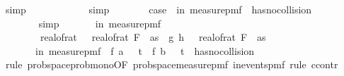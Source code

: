 \begin{isabellebody}
\ simp\isanewline
\ \ \ \ \isamarkupfalse%
\ \isamarkupfalse%
\ {\isachardoublequoteopen}{\isachardot}{\kern0pt}{\isachardot}{\kern0pt}{\isachardot}{\kern0pt}\ {\isacharequal}{\kern0pt}\ {}{\isacharslash}{\kern0pt}{}{\isachardoublequoteclose}\ \isamarkupfalse%
\ {\isacharparenleft}{\kern0pt}simp{\isacharparenright}{\kern0pt}\isanewline
\ \ \ \ \isamarkupfalse%
\ \isamarkupfalse%
\ case{\isacharunderscore}{\kern0pt}{}{\isacharcolon}{\kern0pt}\ {\isachardoublequoteopen}{\isasymP}{\isacharparenleft}{\kern0pt}{\isasymomega}\ in\ measure{\isacharunderscore}{\kern0pt}pmf\ {\isasymOmega}\ {\isasymnot}has{\isacharunderscore}{\kern0pt}no{\isacharunderscore}{\kern0pt}collision\ {\isasymomega}{\isacharparenright}{\kern0pt}\ {\isasymle}\ {}{\isacharslash}{\kern0pt}{}{\isachardoublequoteclose}\ \isanewline
\ \ \ \ \ \ \isamarkupfalse%
\ simp\isanewline
\isanewline
\ \ \ \ \isamarkupfalse%
\ {\isachardoublequoteopen}{\isasymP}{\isacharparenleft}{\kern0pt}{\isasymomega}\ in\ measure{\isacharunderscore}{\kern0pt}pmf\ {\isasymOmega}\isanewline
\ \ \ \ \ \ \ \ real{\isacharunderscore}{\kern0pt}of{\isacharunderscore}{\kern0pt}rat\ {\isasymdelta}\ {\isacharasterisk}{\kern0pt}\ real{\isacharunderscore}{\kern0pt}of{\isacharunderscore}{\kern0pt}rat\ {\isacharparenleft}{\kern0pt}F\ {}\ as{\isacharparenright}{\kern0pt}\ {\isacharless}{\kern0pt}\ {\isasymbar}g{\isacharprime}{\kern0pt}\ {\isacharparenleft}{\kern0pt}h\ {\isasymomega}{\isacharparenright}{\kern0pt}\ {\isacharminus}{\kern0pt}\ real{\isacharunderscore}{\kern0pt}of{\isacharunderscore}{\kern0pt}rat\ {\isacharparenleft}{\kern0pt}F\ {}\ as{\isacharparenright}{\kern0pt}{\isasymbar}{\isacharparenright}{\kern0pt}\ {\isasymle}\ \isanewline
\ \ \ \ \ \ {\isasymP}{\isacharparenleft}{\kern0pt}{\isasymomega}\ in\ measure{\isacharunderscore}{\kern0pt}pmf\ {\isasymOmega}\ f\ a\ {\isasymomega}\ {\isasymge}\ t\ {\isasymor}\ f\ b\ {\isasymomega}\ {\isacharless}{\kern0pt}\ t\ {\isasymor}\ {\isasymnot}{\isacharparenleft}{\kern0pt}has{\isacharunderscore}{\kern0pt}no{\isacharunderscore}{\kern0pt}collision\ {\isasymomega}{\isacharparenright}{\kern0pt}{\isacharparenright}{\kern0pt}{\isachardoublequoteclose}\isanewline
\ \ \ \ \isamarkupfalse%
\ {\isacharparenleft}{\kern0pt}rule\ prob{\isacharunderscore}{\kern0pt}space{\isachardot}{\kern0pt}prob{\isacharunderscore}{\kern0pt}mono{\isacharbrackleft}{\kern0pt}OF\ prob{\isacharunderscore}{\kern0pt}space{\isacharunderscore}{\kern0pt}measure{\isacharunderscore}{\kern0pt}pmf\ in{\isacharunderscore}{\kern0pt}events{\isacharunderscore}{\kern0pt}pmf{\isacharbrackright}{\kern0pt}{\isacharcomma}{\kern0pt}\ rule\ ccontr{\isacharparenright}{\kern0pt}\isanewline

\end{isabellebody}
